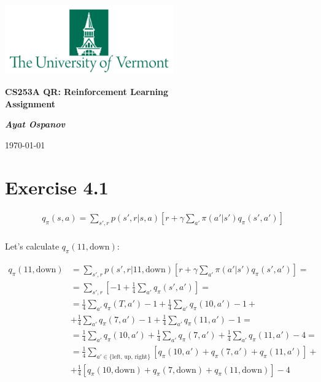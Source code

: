\documentclass[12pt]{article}
\begin{document}
    \begin{center}
        \includegraphics[height=3cm]{pics/UVM.png}

        {\large\textbf{
            CS253A QR: Reinforcement Learning \\ Assignment 
        }}

        \vspace{0.3cm}

        \textit{\textbf{Ayat Ospanov}}

        \today
    \end{center}

    \tableofcontents

    \section{Exercise 4.1}
        \begin{align*}
            &q_\pi(s,a) = \sum\limits_{s',r} p(s',r|s,a)[r +
            \gamma \sum\limits_{a'} \pi(a'|s') q_\pi(s',a')]\\
        \end{align*}

        Let's calculate $q_\pi(11,\text{down}):$

        \begin{align*}
            q_\pi(11,\text{down}) &= \sum\limits_{s',r} p(s',r|11,\text{down})[r +
            \gamma \sum\limits_{a'} \pi(a'|s') q_\pi(s',a')] =\\
            & = \sum\limits_{s',r} [-1 +
            \frac{1}{4} \sum\limits_{a'} q_\pi(s',a')] =\\
            & = \frac{1}{4} \sum\limits_{a'} q_\pi(T,a') - 1 +
            \frac{1}{4} \sum\limits_{a'} q_\pi(10,a') - 1 +\\
            & + \frac{1}{4} \sum\limits_{a'} q_\pi(7,a') - 1 +
            \frac{1}{4} \sum\limits_{a'} q_\pi(11,a') - 1 =\\
            & = \frac{1}{4} \sum\limits_{a'} q_\pi(10,a') +
            \frac{1}{4} \sum\limits_{a'} q_\pi(7,a') +
            \frac{1}{4} \sum\limits_{a'} q_\pi(11,a') - 4 =\\
            & = \frac{1}{4} \sum\limits_{a' \in \{\text{left, up, right}\}}
            [q_\pi(10,a') + q_\pi(7,a') + q_\pi(11,a')] +\\
            & + \frac{1}{4} [q_\pi(10,\text{down}) + q_\pi(7,\text{down}) +
            q_\pi(11,\text{down})] - 4
        \end{align*}
\end{document}
